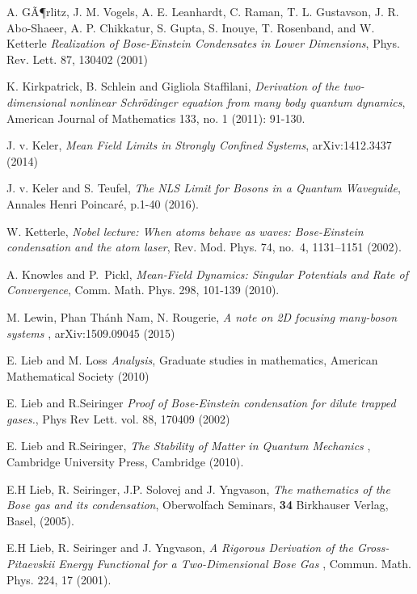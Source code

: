 \documentclass[11pt, english, american]{article}
\begin{document}
\begin{thebibliography}{}
A. GÃ¶rlitz, J. M. Vogels, A. E. Leanhardt, C. Raman, T. L. Gustavson, J. R. Abo-Shaeer, A. P. Chikkatur, S. Gupta, S. Inouye, T. Rosenband, and W. Ketterle
\emph{Realization of Bose-Einstein Condensates in Lower Dimensions},
Phys. Rev. Lett. 87, 130402 (2001)


K. Kirkpatrick, B. Schlein and Gigliola Staffilani, \emph{Derivation of the two-dimensional nonlinear Schr\"odinger equation from many body quantum dynamics}, American Journal of Mathematics 133, no. 1 (2011): 91-130.

J. v. Keler,
\emph{ Mean Field Limits in Strongly Confined Systems},
arXiv:1412.3437 (2014)

J. v. Keler and S. Teufel,
\emph{The NLS Limit for Bosons in a Quantum Waveguide},
Annales Henri Poincar{\'e}, p.1-40 (2016).

W. Ketterle, \emph{Nobel lecture: When atoms behave as waves: Bose-Einstein condensation and the atom laser},
Rev. Mod. Phys. 74, no.~4, 1131--1151 (2002).








A. Knowles and P.~Pickl, \emph{Mean-Field Dynamics: Singular Potentials and Rate of Convergence},  Comm. Math. Phys.  298, 101-139 (2010).



M. Lewin, Phan Th\'anh Nam, N. Rougerie, 
\emph{A note on 2D focusing many-boson systems
},  arXiv:1509.09045 (2015)

E. Lieb and M. Loss
\emph{Analysis}, Graduate studies in mathematics, American Mathematical Society (2010)

E. Lieb and R.Seiringer
\emph{Proof of Bose-Einstein condensation for dilute trapped gases.}, Phys Rev Lett. vol. 88, 170409 (2002)


E. Lieb and R.Seiringer,
\emph{The Stability of Matter in Quantum Mechanics
}, Cambridge University Press, Cambridge (2010).


E.H Lieb, R. Seiringer, J.P. Solovej and J. Yngvason, \emph{The
mathematics of the Bose gas and its condensation}, Oberwolfach
Seminars, {\bf 34} Birkhauser Verlag, Basel, (2005).

E.H Lieb, R. Seiringer and J. Yngvason, \emph{ A Rigorous Derivation of the Gross-Pitaevskii Energy Functional for a Two-Dimensional Bose Gas
},
Commun. Math. Phys. 224, 17 (2001).


\end{thebibliography}
\end{document}
